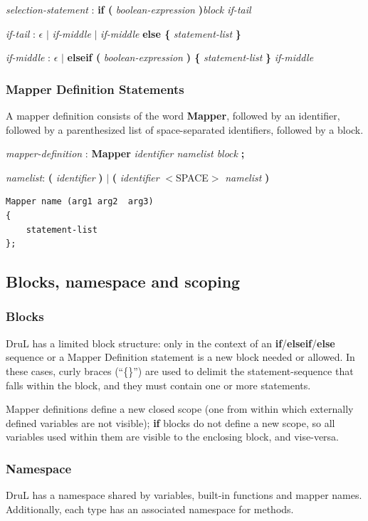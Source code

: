 \documentclass[11pt,twoside]{article}
\begin{document}
\emph{selection-statement} : \textbf{if ( } \emph{boolean-expression} \textbf{ )}\emph{block if-tail}

\emph{if-tail} : $\epsilon$ $|$ \emph{if-middle} $|$
	\emph{if-middle} \textbf{else \{} \emph{statement-list} \textbf{\}} 

\emph{if-middle} : $\epsilon$ $|$   \textbf{elseif ( } \emph{boolean-expression} \textbf{ ) \{} \emph{statement-list} \textbf{\}} \emph{if-middle} 

\subsubsection{Mapper Definition Statements}

A mapper definition consists of the word \textbf{Mapper}, followed by an identifier, followed by a parenthesized list of space-separated identifiers, followed by a block.

\emph{mapper-definition} : \textbf{Mapper} \emph{identifier namelist block} \textbf{;}

\emph{namelist}: \textbf ( \emph{identifier} \textbf ) $|$  \textbf ( \emph{identifier} 
$<$SPACE$>$ \emph{namelist} \textbf )


\begin{verbatim}
Mapper name (arg1 arg2  arg3)
{
    statement-list
};
\end{verbatim}

\subsection{Blocks, namespace and scoping}

\subsubsection{Blocks}
DruL has a limited block structure: only in the context of an \textbf{if}/\textbf{elseif}/\textbf{else} sequence or a Mapper Definition statement is a new block needed or allowed.  In these cases, curly braces (``\{\}'') are used to delimit the statement-sequence that falls within the block, and they must contain one or more statements.

Mapper definitions define a new closed scope (one from within which externally defined variables are not visible); \textbf{if} blocks do not define a new scope, so all variables used within them are visible to the enclosing  block, and vise-versa.

\subsubsection{Namespace}
DruL has a namespace shared by variables, built-in functions and 
mapper names. Additionally, each type has an associated namespace for methods.
\end{document}
